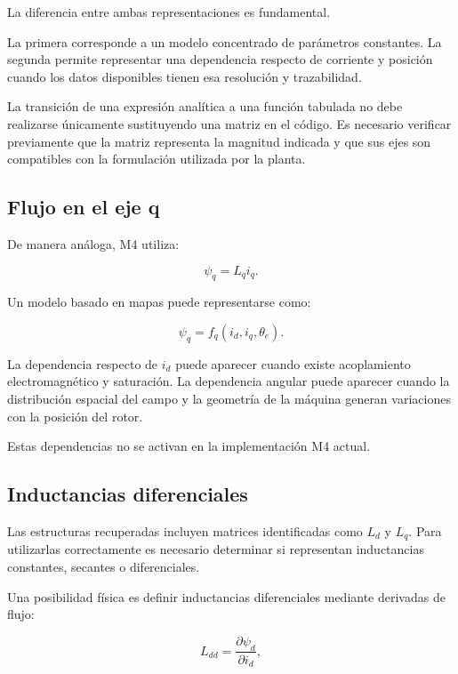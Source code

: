 La diferencia entre ambas representaciones es fundamental.

La primera corresponde a un modelo concentrado de parámetros constantes. La segunda permite representar una dependencia respecto de corriente y posición cuando los datos disponibles tienen esa resolución y trazabilidad.

La transición de una expresión analítica a una función tabulada no debe realizarse únicamente sustituyendo una matriz en el código. Es necesario verificar previamente que la matriz representa la magnitud indicada y que sus ejes son compatibles con la formulación utilizada por la planta.

\subsection{Flujo en el eje q}

De manera análoga, M4 utiliza:

\begin{equation}
\psi_q=L_qi_q.
\end{equation}

Un modelo basado en mapas puede representarse como:

\begin{equation}
\psi_q=f_q(i_d,i_q,\theta_e).
\end{equation}

La dependencia respecto de $i_d$ puede aparecer cuando existe acoplamiento electromagnético y saturación. La dependencia angular puede aparecer cuando la distribución espacial del campo y la geometría de la máquina generan variaciones con la posición del rotor.

Estas dependencias no se activan en la implementación M4 actual.

\subsection{Inductancias diferenciales}

Las estructuras recuperadas incluyen matrices identificadas como $L_d$ y $L_q$. Para utilizarlas correctamente es necesario determinar si representan inductancias constantes, secantes o diferenciales.

Una posibilidad física es definir inductancias diferenciales mediante derivadas de flujo:

\begin{equation}
L_{dd}=
\frac{\partial\psi_d}{\partial i_d},
\end{equation}

